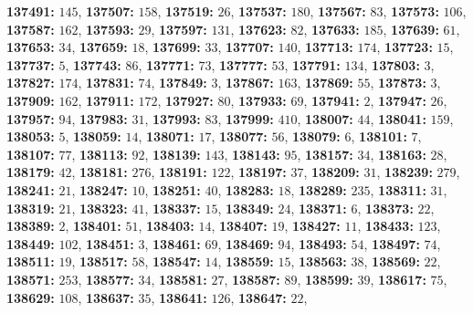\textsf{\bfseries 137491:} $145$, \textsf{\bfseries 137507:} $158$, \textsf{\bfseries 137519:} $26$, \textsf{\bfseries 137537:} $180$, \textsf{\bfseries 137567:} $83$, \textsf{\bfseries 137573:} $106$, \textsf{\bfseries 137587:} $162$, \textsf{\bfseries 137593:} $29$, \textsf{\bfseries 137597:} $131$, \textsf{\bfseries 137623:} $82$, \textsf{\bfseries 137633:} $185$, \textsf{\bfseries 137639:} $61$, \textsf{\bfseries 137653:} $34$, \textsf{\bfseries 137659:} $18$, \textsf{\bfseries 137699:} $33$, \textsf{\bfseries 137707:} $140$, \textsf{\bfseries 137713:} $174$, \textsf{\bfseries 137723:} $15$, \textsf{\bfseries 137737:} $5$, \textsf{\bfseries 137743:} $86$, \textsf{\bfseries 137771:} $73$, \textsf{\bfseries 137777:} $53$, \textsf{\bfseries 137791:} $134$, \textsf{\bfseries 137803:} $3$, \textsf{\bfseries 137827:} $174$, \textsf{\bfseries 137831:} $74$, \textsf{\bfseries 137849:} $3$, \textsf{\bfseries 137867:} $163$, \textsf{\bfseries 137869:} $55$, \textsf{\bfseries 137873:} $3$, \textsf{\bfseries 137909:} $162$, \textsf{\bfseries 137911:} $172$, \textsf{\bfseries 137927:} $80$, \textsf{\bfseries 137933:} $69$, \textsf{\bfseries 137941:} $2$, \textsf{\bfseries 137947:} $26$, \textsf{\bfseries 137957:} $94$, \textsf{\bfseries 137983:} $31$, \textsf{\bfseries 137993:} $83$, \textsf{\bfseries 137999:} $410$, \textsf{\bfseries 138007:} $44$, \textsf{\bfseries 138041:} $159$, \textsf{\bfseries 138053:} $5$, \textsf{\bfseries 138059:} $14$, \textsf{\bfseries 138071:} $17$, \textsf{\bfseries 138077:} $56$, \textsf{\bfseries 138079:} $6$, \textsf{\bfseries 138101:} $7$, \textsf{\bfseries 138107:} $77$, \textsf{\bfseries 138113:} $92$, \textsf{\bfseries 138139:} $143$, \textsf{\bfseries 138143:} $95$, \textsf{\bfseries 138157:} $34$, \textsf{\bfseries 138163:} $28$, \textsf{\bfseries 138179:} $42$, \textsf{\bfseries 138181:} $276$, \textsf{\bfseries 138191:} $122$, \textsf{\bfseries 138197:} $37$, \textsf{\bfseries 138209:} $31$, \textsf{\bfseries 138239:} $279$, \textsf{\bfseries 138241:} $21$, \textsf{\bfseries 138247:} $10$, \textsf{\bfseries 138251:} $40$, \textsf{\bfseries 138283:} $18$, \textsf{\bfseries 138289:} $235$, \textsf{\bfseries 138311:} $31$, \textsf{\bfseries 138319:} $21$, \textsf{\bfseries 138323:} $41$, \textsf{\bfseries 138337:} $15$, \textsf{\bfseries 138349:} $24$, \textsf{\bfseries 138371:} $6$, \textsf{\bfseries 138373:} $22$, \textsf{\bfseries 138389:} $2$, \textsf{\bfseries 138401:} $51$, \textsf{\bfseries 138403:} $14$, \textsf{\bfseries 138407:} $19$, \textsf{\bfseries 138427:} $11$, \textsf{\bfseries 138433:} $123$, \textsf{\bfseries 138449:} $102$, \textsf{\bfseries 138451:} $3$, \textsf{\bfseries 138461:} $69$, \textsf{\bfseries 138469:} $94$, \textsf{\bfseries 138493:} $54$, \textsf{\bfseries 138497:} $74$, \textsf{\bfseries 138511:} $19$, \textsf{\bfseries 138517:} $58$, \textsf{\bfseries 138547:} $14$, \textsf{\bfseries 138559:} $15$, \textsf{\bfseries 138563:} $38$, \textsf{\bfseries 138569:} $22$, \textsf{\bfseries 138571:} $253$, \textsf{\bfseries 138577:} $34$, \textsf{\bfseries 138581:} $27$, \textsf{\bfseries 138587:} $89$, \textsf{\bfseries 138599:} $39$, \textsf{\bfseries 138617:} $75$, \textsf{\bfseries 138629:} $108$, \textsf{\bfseries 138637:} $35$, \textsf{\bfseries 138641:} $126$, \textsf{\bfseries 138647:} $22$, 
